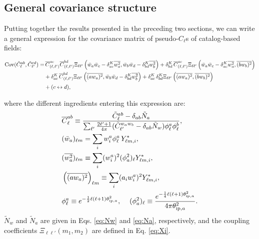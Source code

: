 \documentclass[aps,twocolumn, superscriptaddress, english, nofootinbib, 10pt]{revtex4-2}
\begin{document}
  \subsection{General covariance structure}\label{ssec:theo.general}
    Putting together the results presented in the preceding two sections, we can write a general expression for the covariance matrix of pseudo-$C_\ell$s of catalog-based fields:
    \begin{widetext}
    \begin{align}\nonumber
      {\rm Cov}(\tilde{C}^{ab}_\ell,\tilde{C}^{cd}_{\ell'})
      =&\,\overline{C}^{ac}_{(\ell,\ell')}\overline{C}^{bd}_{(\ell,\ell')}\Xi_{\ell\ell'}\left(\bar{w}_a\bar{w}_c-\delta^K_{ac}\overline{w_a^2},\bar{w}_b\bar{w}_d-\delta^K_{bd}\overline{w_b^2}\right)+\delta^K_{bd}\,\overline{C}^{ac}_{(\ell,\ell')}\Xi_{\ell\ell'}\left(\bar{w}_a\bar{w}_c-\delta^K_{ac}\overline{w_a^2},\overline{(bw_b)^2}\right)\\\label{eq:main_result}
      &+\delta^K_{ac}\,\overline{C}^{bd}_{(\ell,\ell')}\Xi_{\ell\ell'}\left(\overline{(aw_a)^2},\bar{w}_b\bar{w}_d-\delta^K_{bd}\overline{w_b^2}\right)+\delta^K_{ac}\,\delta^K_{bd}\Xi_{\ell\ell'}\left(\overline{(aw_a)^2},\overline{(bw_b)^2}\right)\\\nonumber
      &+(c\leftrightarrow d),
    \end{align}
    \end{widetext}
    where the different ingredients entering this expression are:
    \begin{align}
      &\overline{C}^{ab}_\ell\equiv\frac{\tilde{C}^{ab}_\ell-\delta_{ab}\tilde{N}_a}{\sum_{\ell'}\frac{2\ell'+1}{4\pi}(\tilde{C}^{w_aw_b}_{\ell'}-\delta_{ab}\tilde{N}_w)\phi^a_\ell\phi^b_\ell},\\
      &(\bar{w}_a)_{\ell m}=\sum_iw^a_i\phi^a_\ell\,Y^*_{\ell m,i},\\
      &(\overline{w_a^2})_{\ell m}\equiv\sum_i(w^a_i)^2(\phi^2_a)_\ell Y^*_{\ell m,i},\\\label{eq:awa2}
      &\left(\overline{(aw_a)^2}\right)_{\ell m}\equiv\sum_i(a_iw^a_i)^2Y_{\ell m,i}^*,\\
      &\phi^a_\ell\equiv e^{-\frac{1}{2}\ell(\ell+1)\theta^2_{{\rm ip},a}},
      \hspace{12pt}(\phi^2_a)_\ell\equiv\frac{e^{-\frac{1}{4}\ell(\ell+1)\theta^2_{{\rm ip},a}}}{4\pi\theta^2_{{\rm ip},a}}.
    \end{align}
    $\tilde{N}_w$ and $\tilde{N}_a$ are given in Eqs. \ref{eq:Nw} and \ref{eq:Na}, respectively, and the coupling coefficients $\Xi_{\ell\ell'}(m_1,m_2)$ are defined in Eq. \ref{eq:Xi}.
\end{document}
